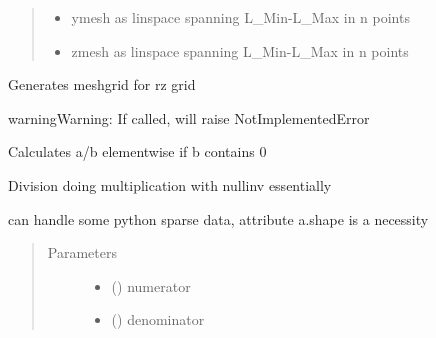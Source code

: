 \documentclass[letterpaper,10pt,english]{sphinxmanual}
\begin{document}
\begin{fulllineitems}
\begin{fulllineitems}
\begin{quote}
\begin{description}
\begin{itemize}
\item {} 
 \textendash{} ymesh as linspace spanning L\_Min-L\_Max in n points

\item {} 
 \textendash{} zmesh as linspace spanning L\_Min-L\_Max in n points

\end{itemize}

\end{description}\end{quote}

\end{fulllineitems}


\begin{fulllineitems}
\label{\detokenize{FIT:FIT.FIT.makeMeshBOR}}
Generates meshgrid for rz grid

\begin{sphinxadmonition}{warning}{Warning:}
If called, will raise NotImplementedError
\end{sphinxadmonition}

\end{fulllineitems}


\begin{fulllineitems}
\label{\detokenize{FIT:FIT.FIT.nulldiv}}
Calculates a/b elementwise if b contains 0

Division doing multiplication with nullinv essentially

can handle some python sparse data, attribute a.shape is a necessity
\begin{quote}\begin{description}
\item[{Parameters}] \leavevmode\begin{itemize}
\item {} 
 () \textendash{} numerator

\item {} 
 () \textendash{} denominator


\end{itemize}
\end{description}
\end{quote}
\end{fulllineitems}
\end{fulllineitems}
\end{document}
